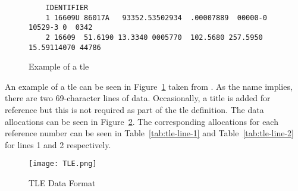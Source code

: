 \begin{figure}[h]
    \begin{verbatim}
    IDENTIFIER
    1 16609U 86017A   93352.53502934  .00007889  00000-0  10529-3 0  0342
    2 16609  51.6190 13.3340 0005770  102.5680 257.5950 15.59114070 44786
    \end{verbatim} 
    \caption{Example of a \gls{tle}}
    \label{fig:tle-ex} 
\end{figure}

An example of a \gls{tle} can be seen in Figure~\ref{fig:tle-ex} taken from
\cite{vallado_fundamentals_2001}.  As the name implies, there are two
69-character lines of data. Occasionally, a title is added for reference but
this is not required as part of the \gls{tle} definition. The data allocations
can be seen in Figure~\ref{fig:tle-legend}. The corresponding allocations for
each reference number can be seen in Table~\ref{tab:tle-line-1} and
Table~\ref{tab:tle-line-2} for lines 1 and 2 respectively.

\begin{figure}[h]
    \centering
    \texttt{[image: TLE.png]} 
    \caption{TLE Data Format}
    \label{fig:tle-legend} 
\end{figure}

